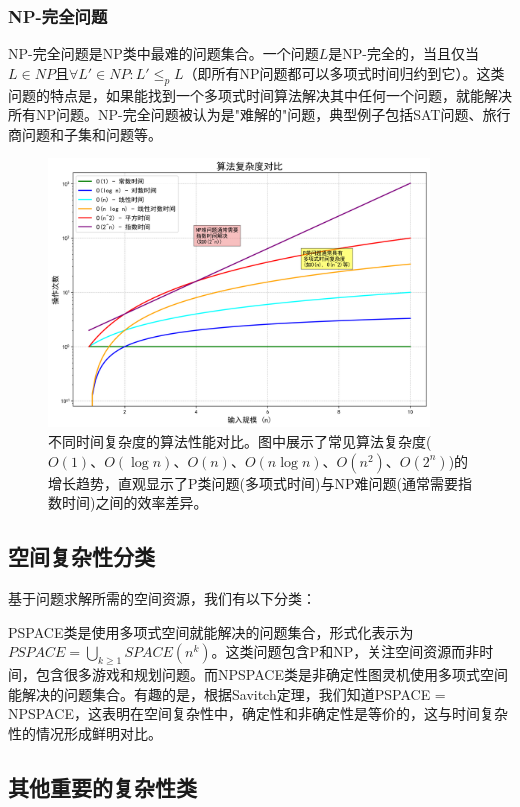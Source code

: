 \documentclass[a4paper,12pt]{ctexart}
\begin{document}
\subsubsection{NP-完全问题}
NP-完全问题是NP类中最难的问题集合。一个问题$L$是NP-完全的，当且仅当$L \in NP$且$\forall L' \in NP: L' \leq_p L$（即所有NP问题都可以多项式时间归约到它）。这类问题的特点是，如果能找到一个多项式时间算法解决其中任何一个问题，就能解决所有NP问题。NP-完全问题被认为是"难解的"问题，典型例子包括SAT问题、旅行商问题和子集和问题等。

\begin{figure}[H]
    \centering
    \includegraphics[width=0.9\textwidth]{img/complexity_comparison.png}
    \caption{不同时间复杂度的算法性能对比。图中展示了常见算法复杂度($O(1)$、$O(\log n)$、$O(n)$、$O(n \log n)$、$O(n^2)$、$O(2^n)$)的增长趋势，直观显示了P类问题(多项式时间)与NP难问题(通常需要指数时间)之间的效率差异。}
    \label{fig:complexity_comparison}
\end{figure}

\subsection{空间复杂性分类}
基于问题求解所需的空间资源，我们有以下分类：

PSPACE类是使用多项式空间就能解决的问题集合，形式化表示为$PSPACE = \bigcup_{k \geq 1} SPACE(n^k)$。这类问题包含P和NP，关注空间资源而非时间，包含很多游戏和规划问题。而NPSPACE类是非确定性图灵机使用多项式空间能解决的问题集合。有趣的是，根据Savitch定理，我们知道PSPACE = NPSPACE，这表明在空间复杂性中，确定性和非确定性是等价的，这与时间复杂性的情况形成鲜明对比。

\subsection{其他重要的复杂性类}
\end{document}
